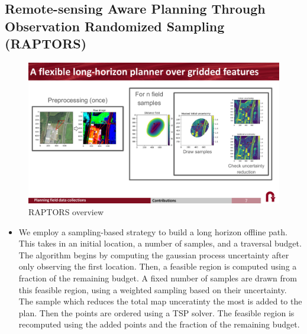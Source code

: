 \subsection{Remote-sensing Aware Planning Through Observation Randomized Sampling (RAPTORS)
}
\begin{figure}
    \centering
    \includegraphics[width=\textwidth]{figs/methods/IPP/RAPTORS_concept.pdf}
    \caption{RAPTORS overview}
    \label{fig:methods:IPP_raptors_overview}
\end{figure}

\begin{itemize}
    \item We employ a sampling-based strategy to build a long horizon offline path. This takes in an initial location, a number of samples, and a traversal budget. The algorithm begins by computing the gaussian process uncertainty after only observing the first location. Then, a feasible region is computed using a fraction of the remaining budget. A fixed number of samples are drawn from this feasible region, using a weighted sampling based on their uncertainty. The sample which reduces the total map unceratinty the most is added to the plan. Then the points are ordered using a TSP solver. The feasible region is recomputed using the added points and the fraction of the remaining budget.
\end{itemize}